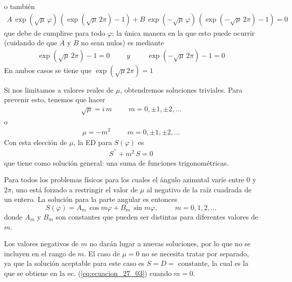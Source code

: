 o también
\begin{align*}
A \, \exp(\sqrt{\mu} \, \varphi) \, (\exp(\sqrt{\mu} \, 2 \pi) - 1) + B \, \exp(- \sqrt{\mu} \, \varphi) \, (\exp(- \sqrt{\mu} \, 2 \pi) - 1) = 0
\end{align*}
que debe de cumplirse para todo $\varphi$; la única manera en la que esto puede ocurrir (cuidando de que $A$ y $B$ no sean nulos) es mediante
\begin{align*}
\exp(\sqrt{\mu} \, 2 \pi) - 1 = 0 \hspace{1cm} y \hspace{1cm} \exp(- \sqrt{\mu} \, 2 \pi) - 1 = 0
\end{align*}
En ambos casos se tiene que $\exp(\sqrt{\mu} 2 \pi) = 1$
\par
Si nos limitamos a valores reales de $\mu$, obtendremos soluciones triviales. Para prevenir esto, tenemos que hacer
\begin{align*}
\sqrt{\mu} = i \, m \hspace{1cm} m = 0, \pm 1, \pm 2, \ldots
\end{align*}
o
\begin{align*}
\mu = -m^{2}  \hspace{1cm} m = 0, \pm 1, \pm 2, \ldots
\end{align*}
Con esta elección de $\mu$, la ED para $S(\varphi)$ es
\begin{align*}
S^{\prime \prime} + m^{2} \, S = 0
\end{align*}
que tiene como solución general: una suma de funciones trigonométricas.
\begin{teo}
Para todos los problemas físicos para los cuales el ángulo azimutal varíe entre $0$ y $2 \pi$, uno está forzado a restringir el valor de $\mu$ al negativo de la raíz cuadrada de un entero. La solución para la parte angular es entonces
\begin{equation}
S (\varphi) = A_{m} \, \cos m \varphi + B_{m} \, \sin m \varphi, \hspace{1cm} m = 0, 1, 2, \ldots
\label{eq:ecuacion_27_03}
\end{equation}
donde $A_{m}$ y $B_{m}$ son constantes que pueden ser distintas para diferentes valores de $m$.
\end{teo}
Los valores negativos de $m$ no darán lugar a nuevas soluciones, por lo que no se incluyen en el rango de $m$. El caso de $\mu = 0$ no se necesita tratar por separado, ya que la solución aceptable para este caso es $S = D = \mbox{ constante}$, la cual es la que se obtiene en la ec. (\ref{eq:ecuacion_27_03}) cuando $m = 0$.
